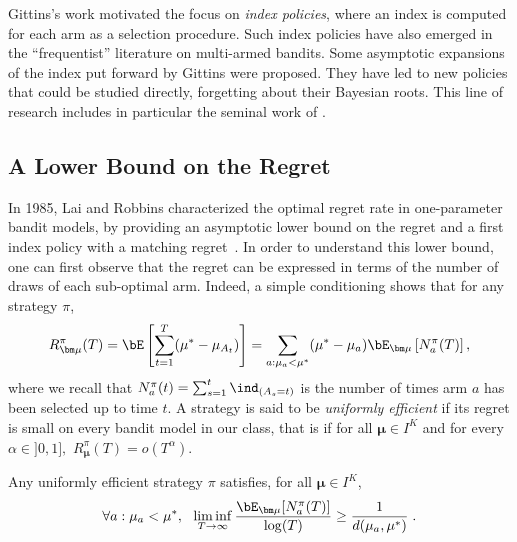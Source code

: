 \documentclass[proc]{edpsmath}
\begin{document}
	Gittins's work motivated the focus on \emph{index policies}, where an index is computed for each arm as a selection procedure. Such index policies have also emerged in the ``frequentist'' literature on multi-armed bandits. Some asymptotic expansions of the index put forward by Gittins  were proposed. They have led to new policies that could be studied directly, forgetting about their Bayesian roots. This line of research includes in particular the seminal work of \cite{LaiRobbins85bandits}. 
	
	
	
	\subsection{A Lower Bound on the Regret}
	
	In 1985, Lai and Robbins characterized the optimal regret rate in one-parameter bandit models, by providing an asymptotic lower bound on the regret and a first index policy with a matching regret~\cite{LaiRobbins85bandits}. In order to understand this lower bound, one can  first observe that the regret can be expressed  in terms of the number of draws of each sub-optimal arm. Indeed, a simple conditioning shows that for any strategy $\pi$, 
	\begin{equation}
	R^{\pi}_{\bm \mu}(T) = \bE\left[\sum_{t=1}^T (\mu^* - \mu_{A_t})\right] = \sum_{a : \mu_a < \mu^*} (\mu^* - \mu_a)\bE_{\bm \mu}\left[N_a^\pi(T)\right],\label{def:regNbDraws}
	\end{equation}
	where we recall that $N_a^\pi(t) = \sum_{s=1}^t \ind_{(A_s =t)}$ is the number of times arm $a$ has been selected up to time $t$. A strategy is said to be \emph{uniformly efficient} if its regret is small on every bandit model in our class, that is if for all $\bm \mu \in I^K$ and for every $\alpha \in ]0,1],$ $R_{\bm \mu}^\pi(T) = o(T^\alpha)$. 
	
	\begin{theorem}{\cite{LaiRobbins85bandits}} \label{thm:LBLR} Any uniformly efficient strategy $\pi$ satisfies, for all $\bm \mu \in I^K$, 
		\[
		\forall a : \mu_a < \mu^*, \ \ \liminf_{T\rightarrow \infty} \frac{\bE_{\bm \mu}[N_a^\pi(T)]}{\log(T)} \geq \frac{1}{d(\mu_a,\mu^*)}\;.
		\]
	\end{theorem}
	
\end{document}
